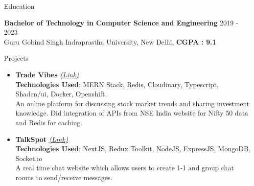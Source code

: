 \documentclass{resume} %
\begin{document}

\begin{rSection}{Education}

{\bf Bachelor of Technology in Computer Science and Engineering} \hfill {2019 - 2023}
\\ 
{\normalfont Guru Gobind Singh Indraprastha University, New Delhi}, \textbf{CGPA : 9.1}

\end{rSection}
 


\begin{rSection}{Projects}
   \begin{itemize}
    \item \textbf{Trade Vibes} 
    \href{https://github.com/tushargahlaut/TradeVibes}
    {\emph{(Link)}}
    \\ \textbf{Technologies Used}: MERN Stack, Redis, Cloudinary, Typescript, Shadcn/ui, Docker, Openshift.
     \\An online platform for discussing stock market trends and sharing investment knowledge. Did integration of APIs from NSE India website for Nifty 50 data and Redis for caching.
    \item \textbf{TalkSpot} 
   \href{https://github.com/tushargahlaut/talkspot-chat-app}{\emph{(Link)}} 
   \\ \textbf{Technologies Used}: NextJS, Redux Toolkit, NodeJS, ExpressJS, MongoDB, Socket.io 
   \\{\normalfont A real time chat website which allows users to create 1-1 and group chat rooms to send/receive messages.}
   
   \end{itemize}
\end{rSection}
\end{document}
